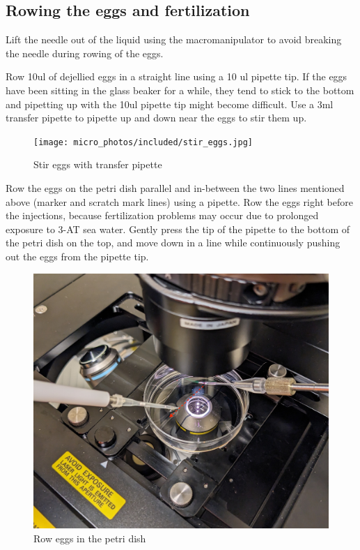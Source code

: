 \documentclass[
  letterpaper,
  DIV=11,
  numbers=noendperiod]{scrartcl}
\begin{document}
\hypertarget{rowing-the-eggs-and-fertilization}{%
\subsection{Rowing the eggs and
fertilization}\label{rowing-the-eggs-and-fertilization}}

Lift the needle out of the liquid using the macromanipulator to avoid
breaking the needle during rowing of the eggs.

Row 10ul of dejellied eggs in a straight line using a 10 ul pipette tip.
If the eggs have been sitting in the glass beaker for a while, they tend
to stick to the bottom and pipetting up with the 10ul pipette tip might
become difficult. Use a 3ml transfer pipette to pipette up and down near
the eggs to stir them up.

\begin{figure}

{\centering \texttt{[image: micro\_photos/included/stir\_eggs.jpg]}

}

\caption{Stir eggs with transfer pipette}

\end{figure}

Row the eggs on the petri dish parallel and in-between the two lines
mentioned above (marker and scratch mark lines) using a pipette. Row the
eggs right before the injections, because fertilization problems may
occur due to prolonged exposure to 3-AT sea water. Gently press the tip
of the pipette to the bottom of the petri dish on the top, and move down
in a line while continuously pushing out the eggs from the pipette tip.

\begin{figure}

{\centering \includegraphics[width=6.25in,height=\textheight]{micro_photos/included/rowing.jpg}

}

\caption{Row eggs in the petri dish}

\end{figure}
\end{document}
